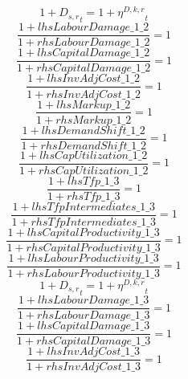 \begin{dmath}
1+{{D_{s,r}}}_{t}=1+{{\eta^{D,k,r}}}_{t}
\end{dmath}
\begin{dmath}
\frac{1+{lhsLabourDamage\_1\_2}}{1+{rhsLabourDamage\_1\_2}}=1
\end{dmath}
\begin{dmath}
\frac{1+{lhsCapitalDamage\_1\_2}}{1+{rhsCapitalDamage\_1\_2}}=1
\end{dmath}
\begin{dmath}
\frac{1+{lhsInvAdjCost\_1\_2}}{1+{rhsInvAdjCost\_1\_2}}=1
\end{dmath}
\begin{dmath}
\frac{1+{lhsMarkup\_1\_2}}{1+{rhsMarkup\_1\_2}}=1
\end{dmath}
\begin{dmath}
\frac{1+{lhsDemandShift\_1\_2}}{1+{rhsDemandShift\_1\_2}}=1
\end{dmath}
\begin{dmath}
\frac{1+{lhsCapUtilization\_1\_2}}{1+{rhsCapUtilization\_1\_2}}=1
\end{dmath}
\begin{dmath}
\frac{1+{lhsTfp\_1\_3}}{1+{rhsTfp\_1\_3}}=1
\end{dmath}
\begin{dmath}
\frac{1+{lhsTfpIntermediates\_1\_3}}{1+{rhsTfpIntermediates\_1\_3}}=1
\end{dmath}
\begin{dmath}
\frac{1+{lhsCapitalProductivity\_1\_3}}{1+{rhsCapitalProductivity\_1\_3}}=1
\end{dmath}
\begin{dmath}
\frac{1+{lhsLabourProductivity\_1\_3}}{1+{rhsLabourProductivity\_1\_3}}=1
\end{dmath}
\begin{dmath}
1+{{D_{s,r}}}_{t}=1+{{\eta^{D,k,r}}}_{t}
\end{dmath}
\begin{dmath}
\frac{1+{lhsLabourDamage\_1\_3}}{1+{rhsLabourDamage\_1\_3}}=1
\end{dmath}
\begin{dmath}
\frac{1+{lhsCapitalDamage\_1\_3}}{1+{rhsCapitalDamage\_1\_3}}=1
\end{dmath}
\begin{dmath}
\frac{1+{lhsInvAdjCost\_1\_3}}{1+{rhsInvAdjCost\_1\_3}}=1
\end{dmath}
